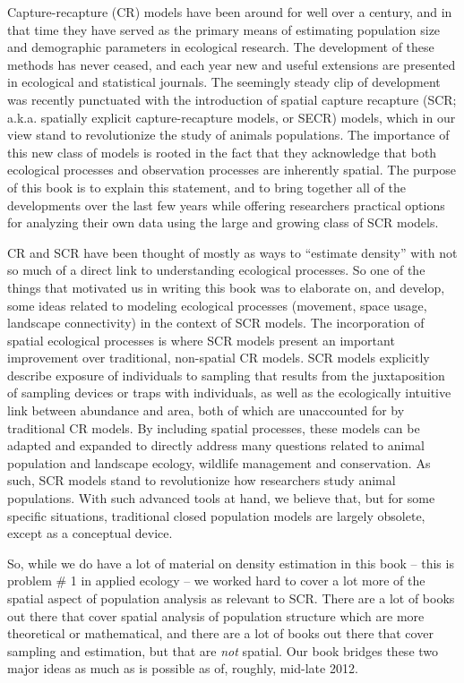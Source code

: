 Capture-recapture (CR) models have been around for well
over a century, and in that time they have served as the primary means of
estimating population size and demographic parameters in ecological
research. The development of these methods has never ceased, and
each year new and useful extensions are presented in ecological and
statistical journals. The seemingly steady clip of development was
recently punctuated with the introduction of spatial capture
recapture (SCR; a.k.a.  spatially explicit capture-recapture models, or SECR)
 models, which in our view stand to revolutionize the
study of animals populations. The importance of this new class of
models is rooted in the fact that they acknowledge that both
ecological processes and observation processes are inherently
spatial. The purpose of this book is to explain this statement, and
to bring together all of the developments over the last few years
while offering researchers practical options for analyzing their own
data using the large and growing class of SCR models.

CR and SCR have been thought of mostly as ways to ``estimate density''
with not so much of a direct link to understanding ecological
processes. So one of the things that motivated us in writing this book
was to elaborate on, and develop, some ideas related to modeling
ecological processes (movement, space usage, landscape connectivity)
in the context of SCR models.  The incorporation of spatial ecological
processes is where SCR models present an important improvement over
traditional, non-spatial CR models.  SCR models explicitly describe
exposure of individuals to sampling that results from the
juxtaposition of sampling devices or traps with individuals, as well
as the ecologically intuitive link between abundance and area, both of
which are unaccounted for by traditional CR models. By including
spatial processes, these models can be adapted and expanded to
directly address many questions related to animal population and
landscape ecology, wildlife management and conservation.  As such, SCR
models stand to revolutionize how researchers study animal
populations.  With such advanced tools at hand, we believe that, but
for some specific situations, traditional closed population models are
largely obsolete, except as a conceptual device.

So, while we do have a lot of material on density estimation in this
book -- this is problem \# 1 in applied ecology -- we worked hard to
cover a lot more of the spatial aspect of population analysis as
relevant to SCR.  There are a lot of books out there that cover
spatial analysis of population structure which are more theoretical or
mathematical, and there are a lot of books out there that cover
sampling and estimation, but that are {\it not} spatial. Our book
bridges these two major ideas as much as is possible as of, roughly,
mid-late 2012.

